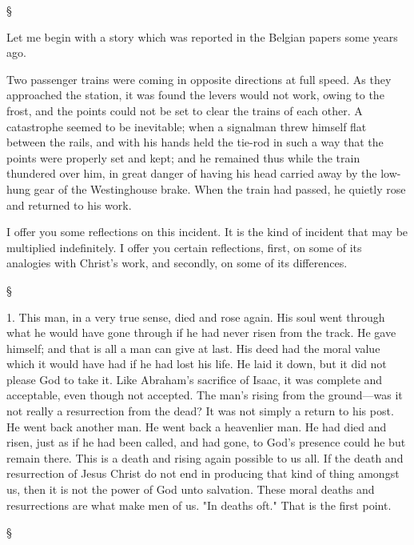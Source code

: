 \documentclass[12pt,letterpaper,oneside]{book}
\begin{document}
\begin{center} \S \end{center}

Let me begin with a story which was reported 
in the Belgian papers some years ago. 

Two passenger trains were coming in opposite 
directions at full speed. As they approached the 
station, it was found the levers would not work, 
owing to the frost, and the points could not be 
set to clear the trains of each other. A catastrophe 
seemed to be inevitable; when a signalman threw himself flat between the rails, and 
with his hands held the tie-rod in such a way 
that the points were properly set and kept; and 
he remained thus while the train thundered 
over him, in great danger of having his head 
carried away by the low-hung gear of the 
Westinghouse brake. When the train had 
passed, he quietly rose and returned to his 
work. 

I offer you some reflections on this incident. 
It is the kind of incident that may be multiplied
indefinitely. I offer you certain reflections, 
first, on some of its analogies with Christ's 
work, and secondly, on some of its differences. 

\begin{center} \S \end{center} 

1. This man, in a very true sense, died and 
rose again. His soul went through what he 
would have gone through if he had never risen 
from the track. He gave himself; and that is 
all a man can give at last. His deed had the 
moral value which it would have had if he had 
lost his life. He laid it down, but it did not 
please God to take it. Like Abraham's sacrifice 
of Isaac, it was complete and acceptable, even 
though not accepted. The man's rising from 
the ground---was it not really a resurrection 
from the dead? It was not simply a return to 
his post. He went back another man. He went 
back a heavenlier man. He had died and risen, 
just as if he had been called, and had gone, to 
God's presence could he but remain there. 
This is a death and rising again possible to us 
all. If the death and resurrection of Jesus 
Christ do not end in producing that kind of 
thing amongst us, then it is not the power of 
God unto salvation. These moral deaths and 
resurrections are what make men of us. "In 
deaths oft." That is the first point. 

\begin{center} \S \end{center} 
\end{document}
